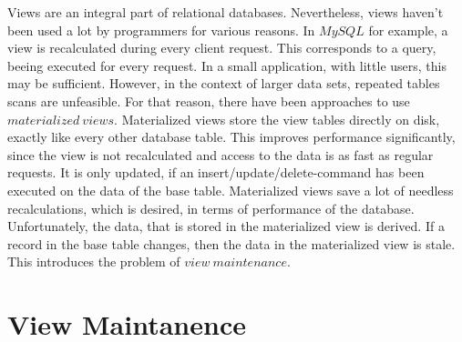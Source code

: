\documentclass[11pt,a4paper,bibtotoc,idxtotoc,headsepline,footsepline,footexclude,BCOR12mm,DIV13]{scrbook}
\begin{document}
Views are an integral part of relational databases. Nevertheless, views haven't been used a lot by programmers for various reasons.  In $MySQL$ for example, a view is recalculated during every client request. This corresponds to a query, beeing executed for every request. In a small application, with little users, this may be sufficient. However, in the context of larger data sets, repeated tables scans are unfeasible. For that reason, there have been approaches to use $materialized\:views$. Materialized views store the view tables directly on disk, exactly like every other database table. This improves performance significantly, since the view is not recalculated and access to the data is as fast as regular requests. It is only updated, if an insert/update/delete-command has been executed on the data of the base table. Materialized views save a lot of needless recalculations, which is desired, in terms of performance of the database. Unfortunately, the data, that is stored in the materialized view is derived. If a record in the base table changes, then the data in the materialized view is stale. This introduces the problem of $view\:maintenance$. 


\section{View Maintanence}
\label{sec:viewmaintenance}
\end{document}
